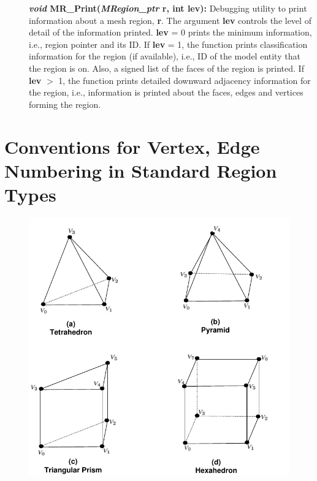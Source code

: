 \documentclass[12pt]{article}
\begin{document}
\begin{description}
  \item[]{\bf {\em void} MR\_Print({\em MRegion\_ptr} r, int
      lev):} Debugging utility to print information about a mesh
    region, {\bf r}. The argument {\bf lev} controls the level
    of detail of the information printed. {\bf lev} = 0 prints the
    minimum information, i.e., region pointer and its ID. If
    {\bf lev} = 1, the function prints classification information
    for the region (if available), i.e., ID of the model entity that
    the region is on. Also, a signed list of the faces of the region
    is printed. If {\bf lev} $>$ 1, the function prints detailed
    downward adjacency information for the region, i.e., information
    is printed about the faces, edges and vertices forming the region.



\end{description}

\newpage
\appendix

\section{Conventions for Vertex, Edge Numbering in Standard Region Types}
\label{app:reg_conventions}

\begin{figure}[!h]
  \begin{center}
    \includegraphics[scale=1.0]{figures/reg_conventions}
  \end{center}
\end{figure}
\end{document}
